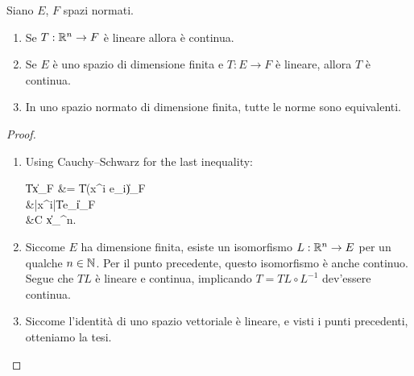 \begin{lemma}
	Siano $E$, $F$ spazi normati.
	\begin{enumerate}
		\item Se $T : \mathbb{R}^n \to F$ è lineare allora è continua.
		\item Se $E$ è uno spazio di dimensione finita e $T : E \to F$ è lineare, allora $T$ è continua.
		\item In uno spazio normato di dimensione finita, tutte le norme sono equivalenti.
	\end{enumerate}
\end{lemma}
\begin{proof}
	\leavevmode
	\begin{enumerate}
		\item Using Cauchy--Schwarz for the last inequality:
		\begin{eqalign}
			\|Tx\|_F &= \|T(x^i e_i)\|_F\\
			&\leq |x^i|\|Te_i\|_F\\
			&\leq C \|x\|_{\R^n}.
		\end{eqalign}
		\item Siccome $E$ ha dimensione finita, esiste un isomorfismo $L:\mathbb{R}^n \to E$ per un qualche $n \in \mathbb{N}$. Per il punto precedente, questo isomorfismo è anche continuo. Segue che $TL$ è lineare e continua, implicando $T = TL \circ L^{-1}$ dev'essere continua.
		\item Siccome l'identità di uno spazio vettoriale è lineare, e visti i punti precedenti, otteniamo la tesi.
	\end{enumerate}
\end{proof}

